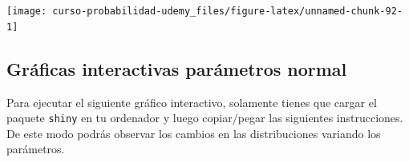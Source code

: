 \documentclass[]{book}
\begin{document}
\begin{center}\texttt{[image: curso-probabilidad-udemy\_files/figure-latex/unnamed-chunk-92-1]} \end{center}

\hypertarget{gruxe1ficas-interactivas-paruxe1metros-normal}{%
\subsection{Gráficas interactivas parámetros normal}\label{gruxe1ficas-interactivas-paruxe1metros-normal}}

Para ejecutar el siguiente gráfico interactivo, solamente tienes que cargar el paquete \texttt{shiny} en tu ordenador y luego copiar/pegar las siguientes instrucciones. De este modo podrás observar los cambios en las distribuciones variando los parámetros.
\end{document}
